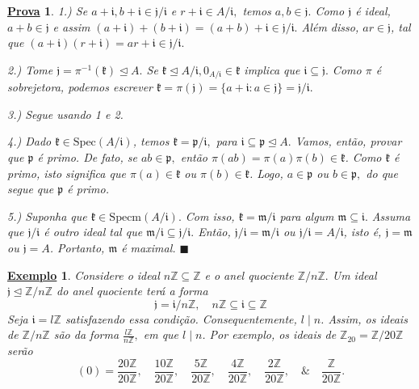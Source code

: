 \documentclass{article}
\newtheorem{example}{\underline{Exemplo}}
\newtheorem*{proof*}{\underline{Prova}}
\renewcommand\qedsymbol{$\blacksquare$}
\begin{document}
    \begin{proof*}
      1.) Se \(a+\mathfrak{i}, b+\mathfrak{i}\in \mathfrak{j}/\mathfrak{i}\) e \(r+\mathfrak{i}\in A/\mathfrak{i},\) temos
      \(a, b\in \mathfrak{j}.\) Como \(\mathfrak{j}\) é ideal, \(a+b\in \mathfrak{j}\) e assim \((a+\mathfrak{i}) + (b+\mathfrak{i}) = (a+b)
      +\mathfrak{i}\in \mathfrak{j}/\mathfrak{i}.\) Além disso, \(ar\in \mathfrak{j}\), tal que \((a+\mathfrak{i})(r+\mathfrak{i})=ar + \mathfrak{i}\in
      \mathfrak{j}/\mathfrak{i}.\)

      2.) Tome \(\mathfrak{j} = \pi^{-1}(\mathfrak{k})\trianglelefteq{A}.\) Se \(\mathfrak{k}\trianglelefteq{A/\mathfrak{i}}, 0_{A/\mathfrak{i}}\in \mathfrak{k}\)
      implica que \(\mathfrak{i}\subseteq{\mathfrak{j}}.\) Como \(\pi \) é sobrejetora, podemos escrever
      \(\mathfrak{k} = \pi(\mathfrak{j}) = \{a+\mathfrak{i}: a\in \mathfrak{j}\} = \mathfrak{j}/\mathfrak{i}.\)

      3.) Segue usando 1 e 2.

      4.) Dado \(\mathfrak{k}\in \mathrm{Spec}(A/\mathfrak{i})\), temos \(\mathfrak{k} = \mathfrak{p}/\mathfrak{i},\)
      para \(\mathfrak{i}\subseteq{\mathfrak{p}}\trianglelefteq{A}.\) Vamos, então, provar que \(\mathfrak{p}\) é primo. 
      De fato, se \(ab\in \mathfrak{p},\) então \(\pi (ab)=\pi(a)\pi(b)\in \mathfrak{k}\). Como \(\mathfrak{k}\) é primo,
      isto significa que \(\pi(a)\in \mathfrak{k}\) ou \(\pi(b)\in \mathfrak{k}\). Logo, \(a\in \mathfrak{p}\) ou \(b\in \mathfrak{p},\) do que
      segue que \(\mathfrak{p}\) é primo.

      5.) Suponha que \(\mathfrak{k}\in \mathrm{Specm}(A/\mathfrak{i}).\) Com isso, \(\mathfrak{k} = \mathfrak{m}/\mathfrak{i}\)
      para algum \(\mathfrak{m}\subseteq{\mathfrak{i}}.\) Assuma que \(\mathfrak{j}/\mathfrak{i}\) é outro ideal tal que \(\mathfrak{m}/\mathfrak{i}\subseteq{\mathfrak{j}/\mathfrak{i}}.\)
      Então, \(\mathfrak{j}/\mathfrak{i} = \mathfrak{m}/\mathfrak{i}\) ou \(\mathfrak{j}/\mathfrak{i} = A/\mathfrak{i}\), isto é,
      \(\mathfrak{j} = \mathfrak{m}\) ou \(\mathfrak{j} = A\). Portanto, \(\mathfrak{m} \) é maximal. \qedsymbol
    \end{proof*}
    \begin{example}
      Considere o ideal \(n \mathbb{Z}\subseteq \mathbb{Z}\) e o anel quociente \(\mathbb{Z}/n \mathbb{Z}.\)
      Um ideal \(\mathfrak{j}\trianglelefteq \mathbb{Z}/n \mathbb{Z}\) do anel quociente terá a forma 
      \[
        \mathfrak{j} = \mathfrak{i}/n \mathbb{Z},\quad n \mathbb{Z}\subseteq \mathfrak{i}\subseteq \mathbb{Z}
      \]
      Seja \(\mathfrak{i} = l \mathbb{Z}\) satisfazendo essa condição. Consequentemente, \(l\mid n\). Assim, os ideais de
      \(\mathbb{Z}/n \mathbb{Z}\) são da forma \(\frac{l \mathbb{Z}}{n \mathbb{Z}},\) em que \(l\mid n\). Por exemplo, os ideais
      de \(\mathbb{Z}_{20} = \mathbb{Z}/20 \mathbb{Z}\) serão 
      \[
        (0) = \frac{20 \mathbb{Z}}{20 \mathbb{Z}},\quad \frac{10 \mathbb{Z}}{20 \mathbb{Z}}, \quad \frac{5 \mathbb{Z}}{20 \mathbb{Z}},\quad \frac{4 \mathbb{Z}}{20 \mathbb{Z}}, \quad \frac{2 \mathbb{Z}}{20 \mathbb{Z}}, \quad\&\quad \frac{\mathbb{Z}}{20 \mathbb{Z}}.
      \]
    \end{example}
    \newpage
\end{document}
